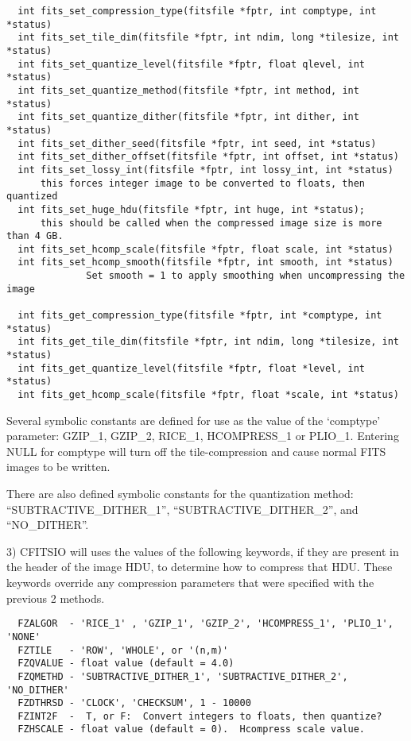 \documentclass[11pt]{book}
\begin{document}
\begin{verbatim}
  int fits_set_compression_type(fitsfile *fptr, int comptype, int *status)
  int fits_set_tile_dim(fitsfile *fptr, int ndim, long *tilesize, int *status)
  int fits_set_quantize_level(fitsfile *fptr, float qlevel, int *status)
  int fits_set_quantize_method(fitsfile *fptr, int method, int *status)
  int fits_set_quantize_dither(fitsfile *fptr, int dither, int *status)
  int fits_set_dither_seed(fitsfile *fptr, int seed, int *status)
  int fits_set_dither_offset(fitsfile *fptr, int offset, int *status)
  int fits_set_lossy_int(fitsfile *fptr, int lossy_int, int *status)
      this forces integer image to be converted to floats, then quantized
  int fits_set_huge_hdu(fitsfile *fptr, int huge, int *status);
      this should be called when the compressed image size is more than 4 GB.
  int fits_set_hcomp_scale(fitsfile *fptr, float scale, int *status)
  int fits_set_hcomp_smooth(fitsfile *fptr, int smooth, int *status)
              Set smooth = 1 to apply smoothing when uncompressing the image

  int fits_get_compression_type(fitsfile *fptr, int *comptype, int *status)
  int fits_get_tile_dim(fitsfile *fptr, int ndim, long *tilesize, int *status)
  int fits_get_quantize_level(fitsfile *fptr, float *level, int *status)
  int fits_get_hcomp_scale(fitsfile *fptr, float *scale, int *status)
\end{verbatim}
Several symbolic constants are defined for use as the value of the
`comptype' parameter:  GZIP\_1, GZIP\_2, RICE\_1, HCOMPRESS\_1 or PLIO\_1.
Entering NULL for comptype will turn off the tile-compression and cause normal FITS
images to be written.

There are also defined symbolic constants for the quantization method:
``SUBTRACTIVE\_DITHER\_1'', ``SUBTRACTIVE\_DITHER\_2'', and ``NO\_DITHER''.

3) CFITSIO will uses the values of the following keywords, if they are present
in the header of the image HDU,
to determine how to compress that HDU.  These keywords override any compression parameters
that were specified with the previous 2 methods.

\begin{verbatim}
  FZALGOR  - 'RICE_1' , 'GZIP_1', 'GZIP_2', 'HCOMPRESS_1', 'PLIO_1', 'NONE'
  FZTILE   - 'ROW', 'WHOLE', or '(n,m)'
  FZQVALUE - float value (default = 4.0)
  FZQMETHD - 'SUBTRACTIVE_DITHER_1', 'SUBTRACTIVE_DITHER_2', 'NO_DITHER'
  FZDTHRSD - 'CLOCK', 'CHECKSUM', 1 - 10000
  FZINT2F  -  T, or F:  Convert integers to floats, then quantize?
  FZHSCALE - float value (default = 0).  Hcompress scale value.
\end{verbatim}
\end{document}
